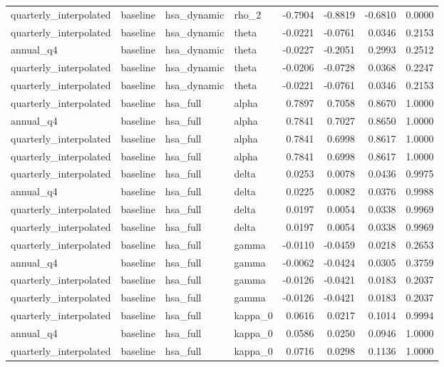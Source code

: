 \begin{tabular}{llllrrrr}
quarterly\_interpolated & baseline & hsa\_dynamic & rho\_2 & -0.7904 & -0.8819 & -0.6810 & 0.0000 \\
quarterly\_interpolated & baseline & hsa\_dynamic & theta & -0.0221 & -0.0761 & 0.0346 & 0.2153 \\
annual\_q4 & baseline & hsa\_dynamic & theta & -0.0227 & -0.2051 & 0.2993 & 0.2512 \\
quarterly\_interpolated & baseline & hsa\_dynamic & theta & -0.0206 & -0.0728 & 0.0368 & 0.2247 \\
quarterly\_interpolated & baseline & hsa\_dynamic & theta & -0.0221 & -0.0761 & 0.0346 & 0.2153 \\
quarterly\_interpolated & baseline & hsa\_full & alpha & 0.7897 & 0.7058 & 0.8670 & 1.0000 \\
annual\_q4 & baseline & hsa\_full & alpha & 0.7841 & 0.7027 & 0.8650 & 1.0000 \\
quarterly\_interpolated & baseline & hsa\_full & alpha & 0.7841 & 0.6998 & 0.8617 & 1.0000 \\
quarterly\_interpolated & baseline & hsa\_full & alpha & 0.7841 & 0.6998 & 0.8617 & 1.0000 \\
quarterly\_interpolated & baseline & hsa\_full & delta & 0.0253 & 0.0078 & 0.0436 & 0.9975 \\
annual\_q4 & baseline & hsa\_full & delta & 0.0225 & 0.0082 & 0.0376 & 0.9988 \\
quarterly\_interpolated & baseline & hsa\_full & delta & 0.0197 & 0.0054 & 0.0338 & 0.9969 \\
quarterly\_interpolated & baseline & hsa\_full & delta & 0.0197 & 0.0054 & 0.0338 & 0.9969 \\
quarterly\_interpolated & baseline & hsa\_full & gamma & -0.0110 & -0.0459 & 0.0218 & 0.2653 \\
annual\_q4 & baseline & hsa\_full & gamma & -0.0062 & -0.0424 & 0.0305 & 0.3759 \\
quarterly\_interpolated & baseline & hsa\_full & gamma & -0.0126 & -0.0421 & 0.0183 & 0.2037 \\
quarterly\_interpolated & baseline & hsa\_full & gamma & -0.0126 & -0.0421 & 0.0183 & 0.2037 \\
quarterly\_interpolated & baseline & hsa\_full & kappa\_0 & 0.0616 & 0.0217 & 0.1014 & 0.9994 \\
annual\_q4 & baseline & hsa\_full & kappa\_0 & 0.0586 & 0.0250 & 0.0946 & 1.0000 \\
quarterly\_interpolated & baseline & hsa\_full & kappa\_0 & 0.0716 & 0.0298 & 0.1136 & 1.0000 \\

\end{tabular}
